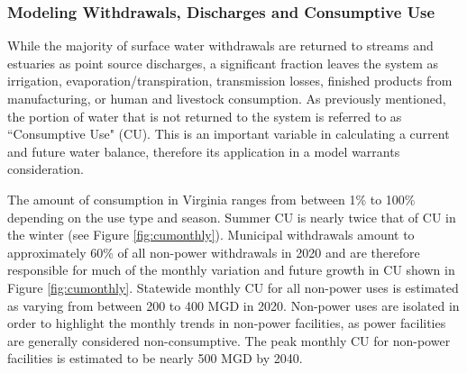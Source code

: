 \subsubsection{Modeling Withdrawals, Discharges and Consumptive Use}
\label{sec:consumptive-use}


\begin{multicols}{2}
\noindent While the majority of surface water withdrawals are returned to streams and estuaries as point source discharges, a significant fraction leaves the system as irrigation, evaporation/transpiration, transmission losses, finished products from manufacturing, or human and livestock consumption. As previously mentioned, the portion of water that is not returned to the system is referred to as ``Consumptive Use" (CU). This is an important variable in calculating a current and future water balance, therefore its application in a model warrants consideration. \medskip

\noindent The amount of consumption in Virginia ranges from between 1\% to 100\% depending on the use type and season.  Summer CU is nearly twice that of CU in the winter (see Figure \ref{fig:cumonthly}).  Municipal withdrawals amount to approximately 60\% of all non-power withdrawals in 2020 and are therefore responsible for much of the monthly variation and future growth in CU shown in Figure \ref{fig:cumonthly}. Statewide monthly CU for all non-power uses is estimated as varying from between 200 to 400 MGD in 2020.  Non-power uses are isolated in order to highlight the monthly trends in non-power facilities, as power facilities are generally considered non-consumptive. The peak monthly CU for non-power facilities is estimated to be nearly 500 MGD by 2040.  
\end{multicols}




